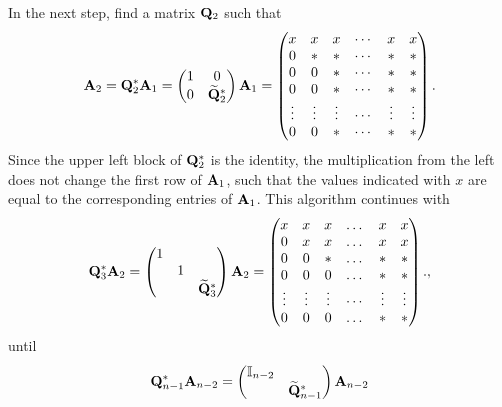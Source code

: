 \begin{intro}
  In the next step, find a matrix $\mathbf Q_2$ such that
  \begin{gather}
    \mathbf A_2 = \mathbf Q_2^* \mathbf A_1
    =
    \begin{pmatrix}
      1 & 0 \\ 0 & \widetilde{\mathbf Q}_2^*
    \end{pmatrix}
    \mathbf A_1
    =
    \begin{pmatrix}
      x & x & x & \cdots & x & x \\
      0 & * & * & \cdots & * & * \\
      0 & 0 & * & \cdots & * & * \\
      0 & 0 & * & \cdots & * & * \\
      \vdots & \vdots & \vdots & \cdots & \vdots & \vdots \\
      0 & 0 & * & \cdots & * & * \\
    \end{pmatrix}.
  \end{gather}
  Since the upper left block of $\mathbf Q_2^*$ is the
  identity, the multiplication from the left does not change the first
  row of $\mathbf A_1$, such that the values indicated with $x$ are equal
  to the corresponding entries of $\mathbf A_1$. This algorithm continues with
  \begin{gather}
    \mathbf Q_3^* \mathbf A_2 =
    \begin{pmatrix}
      1&&\\
      &1&\\
      &&\widetilde{\mathbf Q}_3^*
    \end{pmatrix}
    \mathbf A_2
        =
    \begin{pmatrix}
      x & x & x & \dots & x & x \\
      0 & x & x & \dots & x & x \\
      0 & 0 & * & \dots & * & * \\
      0 & 0 & 0 & \dots & * & * \\
      \vdots & \vdots & \vdots & \cdots & \vdots & \vdots \\
      0 & 0 & 0 & \dots & * & * \\
    \end{pmatrix}.
    ,
  \end{gather}
  until
  \begin{gather}
    \matq_{n-1}^*\mata_{n-2}
    =
    \begin{pmatrix}
      \id_{n-2}&\\
      &\widetilde\matq_{n-1}^*
    \end{pmatrix}\mata_{n-2}

\end{gather}
\end{intro}
